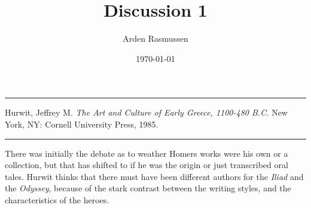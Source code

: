 \documentclass[12pt]{amsart}
\title{Discussion 1}
\author{Arden Rasmussen}
\date{\today}
\begin{document}
\maketitle

\par\noindent\rule{\textwidth}{0.4pt}

\begin{hangparas}{.25in}{1}
  Hurwit, Jeffrey M. \textit{The Art and Culture of Early Greece, 1100-480
  B.C.} New York, NY: Cornell University Press, 1985.
\end{hangparas}

\par\noindent\rule{\textwidth}{0.4pt}

There was initially the debate as to weather Homers works were his own or a
collection, but that has shifted to if he was the origin or just transcribed
oral tales. Hurwit thinks that there must have been different authors for the
\textit{Iliad} and the \textit{Odyssey}, because of the stark contrast between
the writing styles, and the characteristics of the heroes.
\end{document}
